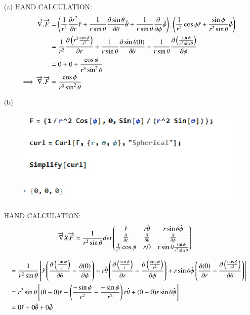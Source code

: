 \documentclass[journal,12pt,onecolumn]{IEEEtran}
\theoremstyle{remark}
\begin{document}
 (a) HAND CALCULATION:\\
\begin{align}
\overrightarrow{\nabla}.\overrightarrow{F}&=\left(\frac{1}{r^2}\frac{\partial r^2}{\partial  r}\hat{r}+\frac{1}{r\sin\theta }\frac{\partial \sin\theta }{\partial \theta}\hat{\theta}+\frac{1}{r\sin\theta}\frac{\partial }{\partial \phi}\hat{\phi}\right).\left(\frac{1}{r^2}\cos \phi \hat{r} + \frac{\sin \phi}{r^2 \sin \theta} \hat{\phi}\right)\\
&= \frac{1}{r^2}\frac{\partial \left(r^2\frac{\cos\phi}{r^2}\right)}{\partial  r}+\frac{1}{r\sin\theta }\frac{\partial \sin\theta(0)}{\partial \theta} +\frac{1}{r\sin\theta}\frac{\partial \left(\frac{\sin\phi}{r^2\sin\theta}\right)}{\partial \phi}\\
&=0+0+\frac{\cos\phi}{r^3\sin^2\theta}\\
\implies \overrightarrow{\nabla}.\overrightarrow{F}&=\frac{\cos\phi}{r^3\sin^2\theta}
\end{align}

(b)  \begin{figure}[H]
    \centering
     \includegraphics[scale=0.5]{figs/curl.jpeg}
    \caption{}    
    \label{fig:ishitha.em.fig1}
\end{figure}
HAND CALCULATION:\\
\begin{align}
\overrightarrow{\nabla}X\overrightarrow{F}&=
\frac{1}{r^2\sin\theta}det\begin{pmatrix}
\hat{r} & r\hat{\theta} & r\sin\theta\hat{\phi} \\
\frac{\partial}{\partial r}&\frac{\partial}{\partial \theta}&\frac{\partial}{\partial\phi}\\
\frac{1}{r^2}\cos \phi &r.0&r\sin\theta\frac{\sin \phi}{r^2 \sin \theta}
\end{pmatrix}
\end{align}

\begin{align}
&=\frac{1}{r^2\sin\theta}{}\left[\hat{r}\left(\frac{\partial\left(\frac{\sin\phi}{r}\right)}{\partial \theta}-\frac{\partial (0)}{\partial \phi}\right)-r \hat{\theta}\left(\frac{\partial\left(\frac{\sin\phi}{r}\right)}{\partial r}-\frac{\partial \left(\frac{\cos\phi}{r^2}\right)}{\partial \phi}\right)+r \sin\theta\hat{\phi}\left(\frac{\partial (0)}{\partial r} -\frac{\partial\left(\frac{\cos\phi}{r^2}\right)}{\partial \theta}\right)\right] \\
&={r^2\sin\theta}{}\left[(0-0)\hat{r}-\left(\frac{-\sin\phi}{r^2}-\frac{-\sin\phi}{r^2}\right)r\hat{\theta}+(0-0)r\sin\theta\hat{\phi}\right]\\
&=0\hat{r}+0\hat{\theta}+0\hat{\phi}
\end{align}
\end{document}
